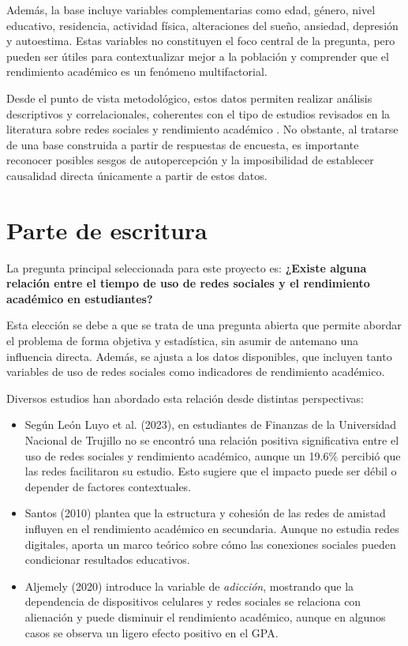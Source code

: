 \documentclass[12pt]{article}
\begin{document}
Además, la base incluye variables complementarias como edad, género, nivel educativo, residencia,
actividad física, alteraciones del sueño, ansiedad, depresión y autoestima. Estas variables no
constituyen el foco central de la pregunta, pero pueden ser útiles para contextualizar mejor a la
población y comprender que el rendimiento académico es un fenómeno multifactorial.

Desde el punto de vista metodológico, estos datos permiten realizar análisis descriptivos y
correlacionales, coherentes con el tipo de estudios revisados en la literatura sobre redes sociales
y rendimiento académico \cite{leon2023,rodelomoreno2018,miranda2023}. No obstante, al tratarse
de una base construida a partir de respuestas de encuesta, es importante reconocer posibles sesgos
de autopercepción y la imposibilidad de establecer causalidad directa únicamente a partir de estos
datos.


\section{Parte de escritura}

La pregunta principal seleccionada para este proyecto es:  
\textbf{¿Existe alguna relación entre el tiempo de uso de redes sociales y el rendimiento académico en estudiantes?}

Esta elección se debe a que se trata de una pregunta abierta que permite abordar el problema de forma objetiva y estadística, sin asumir de antemano una influencia directa. Además, se ajusta a los datos disponibles, que incluyen tanto variables de uso de redes sociales como indicadores de rendimiento académico.

Diversos estudios han abordado esta relación desde distintas perspectivas:

\begin{itemize}
  \item Según León Luyo et al. (2023), en estudiantes de Finanzas de la Universidad Nacional de Trujillo no se encontró una relación positiva significativa entre el uso de redes sociales y rendimiento académico, aunque un 19.6\% percibió que las redes facilitaron su estudio. Esto sugiere que el impacto puede ser débil o depender de factores contextuales.
  \item Santos (2010) plantea que la estructura y cohesión de las redes de amistad influyen en el rendimiento académico en secundaria. Aunque no estudia redes digitales, aporta un marco teórico sobre cómo las conexiones sociales pueden condicionar resultados educativos.
  \item Aljemely (2020) introduce la variable de \textit{adicción}, mostrando que la dependencia de dispositivos celulares y redes sociales se relaciona con alienación y puede disminuir el rendimiento académico, aunque en algunos casos se observa un ligero efecto positivo en el GPA.
\end{itemize}
\end{document}
